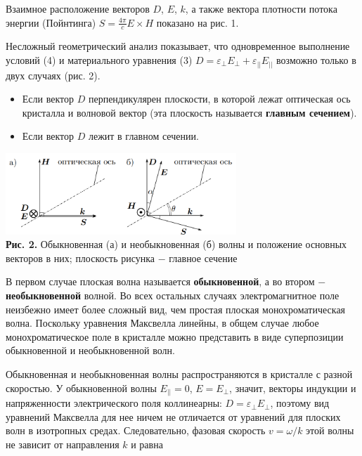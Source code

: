 \documentclass[a4paper,12pt]{article} %
\begin{document}
\hfill \break Взаимное расположение векторов $D$, $E$, $k$, а также вектора плотности потока энергии (Пойнтинга) $S = \frac{4\pi}{c} E \times H$ показано на рис. 1.

\hfill \break Несложный геометрический анализ показывает, что одновременное выполнение условий (4) и материального уравнения (3) $D = \varepsilon_{\perp}E_{\perp} + \varepsilon_{||}E_{||}$ возможно только в двух случаях (рис. 2).

\begin{itemize}
    \item Если вектор $D$ перпендикулярен плоскости, в которой лежат оптическая ось кристалла и волновой вектор (эта плоскость называется \textbf{главным сечением}).
    \item Если вектор $D$ лежит в главном сечении.
\end{itemize}

\begin{center}
\includegraphics[width=0.65\textwidth]{4.7.2_2.png}\\
\textbf{Рис. 2.} Обыкновенная (а) и необыкновенная (б) волны и положение основных векторов в них; плоскость рисунка $-$ главное сечение \\
\end{center}

\hfill \break В первом случае плоская волна называется \textbf{обыкновенной}, а во втором $-$ \textbf{необыкновенной} волной. Во всех остальных случаях электромагнитное поле неизбежно имеет более сложный вид, чем простая плоская монохроматическая волна. Поскольку уравнения Максвелла линейны, в общем случае любое монохроматическое поле в кристалле можно представить в виде суперпозиции обыкновенной и необыкновенной волн.

\hfill \break Обыкновенная и необыкновенная волны распространяются в кристалле с разной скоростью. У обыкновенной волны $E_{||} = 0$, $E = E_{\perp}$, значит, векторы индукции и напряженности электрического поля коллинеарны: $D = \varepsilon_{\perp}E_{\perp}$, поэтому вид уравнений Максвелла для нее ничем не отличается от уравнений для плоских волн в изотропных средах. Следовательно, фазовая скорость $v = \omega/k$ этой волны не зависит от направления $k$ и равна
\end{document}
